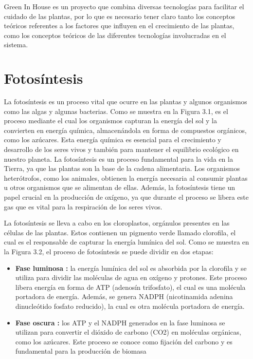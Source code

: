 
Green In House es un proyecto que combina diversas tecnologías para facilitar el cuidado de las plantas, por lo que es necesario tener claro tanto los conceptos teóricos referentes a los factores que influyen en el crecimiento de las plantas, como los conceptos teóricos de las diferentes tecnologías involucradas en el sistema.

\section{Fotosíntesis}
La fotosíntesis \cite{wiki:fotosíntesis} es un proceso vital que ocurre en las plantas y algunos organismos como las algas y algunas bacterias. Como se muestra en la Figura 3.1, es el proceso mediante el cual los organismos capturan la energía del sol y la convierten en energía química, almacenándola en forma de compuestos orgánicos, como los azúcares. Esta energía química es esencial para el crecimiento y desarrollo de los seres vivos y también para mantener el equilibrio ecológico en nuestro planeta.
La fotosíntesis es un proceso fundamental para la vida en la Tierra, ya que las plantas son la base de la cadena alimentaria. Los organismos heterótrofos, como los animales, obtienen la energía necesaria al consumir plantas u otros organismos que se alimentan de ellas. Además, la fotosíntesis tiene un papel crucial en la producción de oxígeno, ya que durante el proceso se libera este gas que es vital para la respiración de los seres vivos.

La fotosíntesis se lleva a cabo en los cloroplastos, orgánulos presentes en las células de las plantas. Estos contienen un pigmento verde llamado clorofila, el cual es el responsable de capturar la energía lumínica del sol. Como se muestra en la Figura 3.2, el proceso de fotosíntesis se puede dividir en dos etapas: 
\begin{itemize}
    \item \textbf{Fase luminosa \cite{wiki:fase_luminosa}:} la energía lumínica del sol es absorbida por la clorofila y se utiliza para dividir las moléculas de agua en oxígeno y protones. Este proceso libera energía en forma de ATP (adenosín trifosfato), el cual es una molécula portadora de energía. Además, se genera NADPH (nicotinamida adenina dinucleótido fosfato reducido), la cual es otra molécula portadora de energía.
    \item \textbf{Fase oscura \cite{wiki:fase_oscura}:} los ATP y el NADPH generados en la fase luminosa se utilizan para convertir el dióxido de carbono (CO2) en moléculas orgánicas, como los azúcares. Este proceso se conoce como fijación del carbono y es fundamental para la producción de biomasa
\end{itemize}

